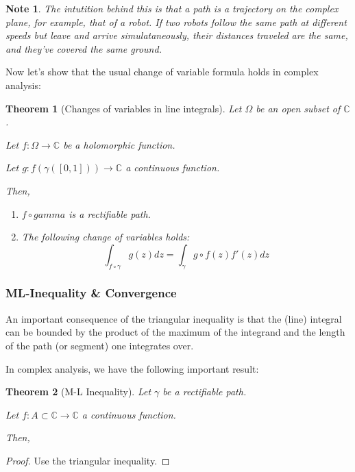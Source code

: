 \documentclass{article}
\newtheorem*{note}{Note}
\newtheorem*{thm*}{Theorem}
\begin{document}
\begin{note}
    The intutition behind this is that a path is a trajectory on the complex plane, for example, that of a robot. If two robots follow the same path at different speeds but leave and arrive simulataneously, their distances traveled are the same, and they've covered the same ground.
\end{note}

Now let's show that the usual change of variable formula holds in complex analysis:

\begin{thm*}[Changes of variables in line integrals]
    Let $\Omega$ be an open subset of $\mathbb{C}$.

    Let $f: \Omega \rightarrow \mathbb{C}$ be a holomorphic function.

    Let $g: f(\gamma([0,1])) \rightarrow \mathbb{C}$ a continuous function.

    Then,
    \begin{enumerate}
        \item $f\circ gamma$ is a rectifiable path.
        \item The following change of variables holds:
            $$\int_{f \circ \gamma}g(z)dz = \int_\gamma g\circ f(z)f'(z)dz$$
    \end{enumerate}

\end{thm*}

\subsubsection{ML-Inequality \& Convergence}

An important consequence of the triangular inequality is that the (line) integral can be bounded by the product of the maximum of the integrand and the length of the path (or segment) one integrates over.

In complex analysis, we have the following important result:

\begin{thm*}[M-L Inequality]
    Let $\gamma$ be a rectifiable path.

    Let $f: A\subset\mathbb{C} \rightarrow \mathbb{C}$ a continuous function.

    Then, 
\end{thm*}

\begin{proof}
    Use the triangular inequality.
\end{proof}
\end{document}
